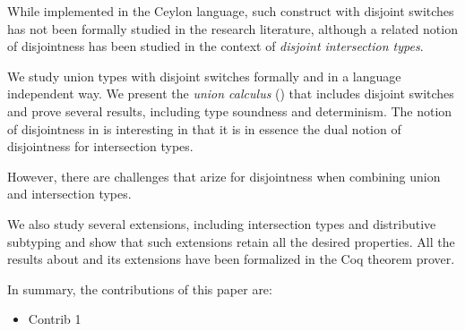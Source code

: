 While implemented in the Ceylon language, such construct
with disjoint switches has not been formally studied in the research
literature, although a related notion of disjointness has been studied
in the context of \emph{disjoint intersection types}.

We study union types
with disjoint switches formally and in a language independent way.
We present the \emph{union calculus} (\cal) that includes disjoint
switches and prove several results, including type soundness and
determinism. The notion of disjointness in \cal is interesting in that
it is in essence the dual notion of disjointness for intersection types. 

However, there are challenges that arize for disjointness when combining
union and intersection types.

We also study several extensions, including intersection
types and distributive subtyping and show that such extensions retain
all the desired properties. All the results about \cal and its
extensions have been formalized in the Coq theorem prover.

In summary, the contributions of this paper are:

\begin{itemize}
\item Contrib 1
\end{itemize}






